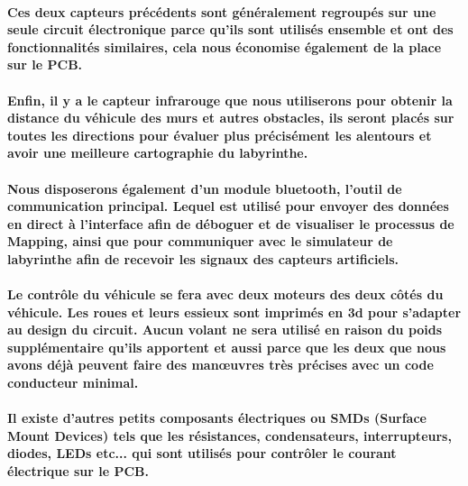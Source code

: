 \paragraph{
	Ces deux capteurs précédents sont généralement regroupés sur une seule circuit électronique 
parce qu'ils sont utilisés ensemble et ont des fonctionnalités similaires, cela nous 
économise également de la place sur le PCB.
}

\paragraph{
	Enfin, il y a le capteur infrarouge que nous utiliserons pour obtenir la distance 
du véhicule des murs et autres obstacles, ils seront placés sur toutes les directions 
pour évaluer plus précisément les alentours et avoir une meilleure cartographie du 
labyrinthe.
}

\paragraph{
	Nous disposerons également d'un module bluetooth, l'outil de communication principal. 
Lequel est utilisé pour envoyer des données en direct à l'interface afin de déboguer 
et de visualiser le processus de Mapping, ainsi que pour communiquer avec le simulateur 
de labyrinthe afin de recevoir les signaux des capteurs artificiels.
}

\paragraph{
	Le contrôle du véhicule se fera avec deux moteurs des deux côtés du véhicule. Les 
roues et leurs essieux sont imprimés en 3d pour s'adapter au design du circuit. Aucun 
volant ne sera utilisé en raison du poids supplémentaire qu'ils apportent et aussi 
parce que les deux que nous avons déjà peuvent faire des manœuvres très précises 
avec un code conducteur minimal.
}

\paragraph{
	Il existe d'autres petits composants électriques ou SMDs (Surface Mount Devices) 
tels que les résistances, condensateurs, interrupteurs, diodes, LEDs etc... qui sont 
utilisés pour contrôler le courant électrique sur le PCB.
}
